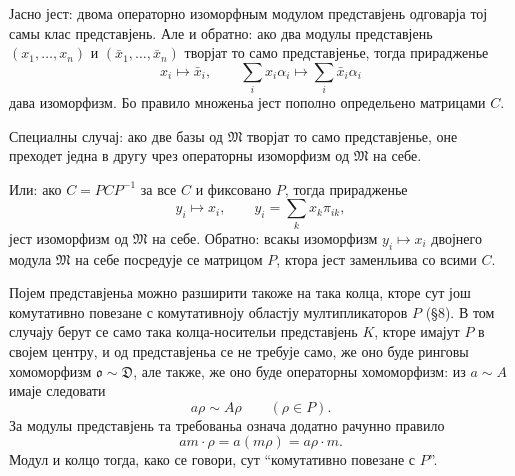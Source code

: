 ﻿\documentclass[11pt]{article}
\providecommand{\mo}{\mathfrak{o}}
\providecommand{\mM}{\mathfrak{M}}
\begin{document}
Јасно јест: двома операторно изоморфным модулом представјень одговарја тој самы клас представјень. Але и обратно: ако два модулы представјень $(x_1,\ldots,x_n)$ и $(\bar x_1,\ldots,\bar x_n)$ творјат то само представјенье, тогда прирадженье
\[
        x_i\mapsto\bar x_i,
        \qquad
        \sum_i x_i\alpha_i\mapsto\sum_i\bar x_i\alpha_i
\]
дава изоморфизм. Бо правило множеньа јест пополно определьено матрицами $C$.

Специалны случај: ако две базы од $\mM$ творјат то само представјенье, оне преходет једна в другу чрез операторны изоморфизм од $\mM$ на себе.

Или: ако $C=PCP^{-1}$ за все $C$ и фиксовано $P$, тогда прирадженье
\[
        y_i\mapsto x_i,
        \qquad y_i=\sum_kx_k\pi_{ik},
\]
јест изоморфизм од $\mM$ на себе. Обратно: всакы изоморфизм $y_i\mapsto x_i$ двојнего модула $\mM$ на себе посредује се матрицом $P$, ктора јест заменльива со всими $C$.

Појем представјеньа можно разширити такоже на така колца, кторе сут још комутативно повезане с комутативноју областју мултипликаторов $P$ (§8). В том случају берут се само така колца-носительи представјень $K$, кторе имајут $P$ в својем центру, и од представјеньа се не требује само, же оно буде ринговы хомоморфизм $\mo\sim\mathfrak D$, але также, же оно буде операторны хомоморфизм: из $a\sim A$ имаје следовати
\[
        a\rho\sim A\rho\qquad(\rho\in P).
\]
За модулы представјень та требованьа означа додатно рачунно правило
\[
        am\cdot\rho=a(m\rho)=a\rho\cdot m.
\]
Модул и колцо тогда, како се говори, сут ``комутативно повезане с $P$''.
\end{document}
